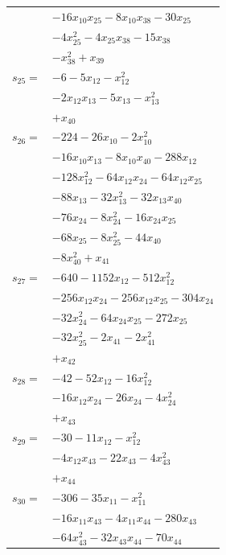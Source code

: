 \begin{longtable}{@{}r@{\;}l@{}}
 & \(\displaystyle -16x_{10}x_{25} -8x_{10}x_{38} -30x_{25}\) \\
 & \(\displaystyle -4x_{25}^{2} -4x_{25}x_{38} -15x_{38}\) \\
 & \(\displaystyle -x_{38}^{2} +x_{39}\) \\[3pt]
\(s_{25}=\) & \(\displaystyle -6 -5x_{12} -x_{12}^{2}\) \\
 & \(\displaystyle -2x_{12}x_{13} -5x_{13} -x_{13}^{2}\) \\
 & \(\displaystyle +x_{40}\) \\[3pt]
\(s_{26}=\) & \(\displaystyle -224 -26x_{10} -2x_{10}^{2}\) \\
 & \(\displaystyle -16x_{10}x_{13} -8x_{10}x_{40} -288x_{12}\) \\
 & \(\displaystyle -128x_{12}^{2} -64x_{12}x_{24} -64x_{12}x_{25}\) \\
 & \(\displaystyle -88x_{13} -32x_{13}^{2} -32x_{13}x_{40}\) \\
 & \(\displaystyle -76x_{24} -8x_{24}^{2} -16x_{24}x_{25}\) \\
 & \(\displaystyle -68x_{25} -8x_{25}^{2} -44x_{40}\) \\
 & \(\displaystyle -8x_{40}^{2} +x_{41}\) \\[3pt]
\(s_{27}=\) & \(\displaystyle -640 -1152x_{12} -512x_{12}^{2}\) \\
 & \(\displaystyle -256x_{12}x_{24} -256x_{12}x_{25} -304x_{24}\) \\
 & \(\displaystyle -32x_{24}^{2} -64x_{24}x_{25} -272x_{25}\) \\
 & \(\displaystyle -32x_{25}^{2} -2x_{41} -2x_{41}^{2}\) \\
 & \(\displaystyle +x_{42}\) \\[3pt]
\(s_{28}=\) & \(\displaystyle -42 -52x_{12} -16x_{12}^{2}\) \\
 & \(\displaystyle -16x_{12}x_{24} -26x_{24} -4x_{24}^{2}\) \\
 & \(\displaystyle +x_{43}\) \\[3pt]
\(s_{29}=\) & \(\displaystyle -30 -11x_{12} -x_{12}^{2}\) \\
 & \(\displaystyle -4x_{12}x_{43} -22x_{43} -4x_{43}^{2}\) \\
 & \(\displaystyle +x_{44}\) \\[3pt]
\(s_{30}=\) & \(\displaystyle -306 -35x_{11} -x_{11}^{2}\) \\
 & \(\displaystyle -16x_{11}x_{43} -4x_{11}x_{44} -280x_{43}\) \\
 & \(\displaystyle -64x_{43}^{2} -32x_{43}x_{44} -70x_{44}\) \\

\end{longtable}
